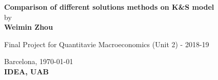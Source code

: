 \begin{center} 



\large{
\textbf{Comparison of different solutions methods on K\&S model}\\
\vspace{0.5cm}
\Large {by}\\  
\vspace{0.25cm}
}
\textbf{Weimin Zhou}\\

\vspace{0.7cm}

\Large{Final Project for Quantitavie Macroeconomics (Unit 2) - 2018-19}\\
\vspace{0.7cm}

Barcelona,\,\,\today \\
\vspace{0.3cm}
\textbf{IDEA, UAB}		
   
\end{center}

  
